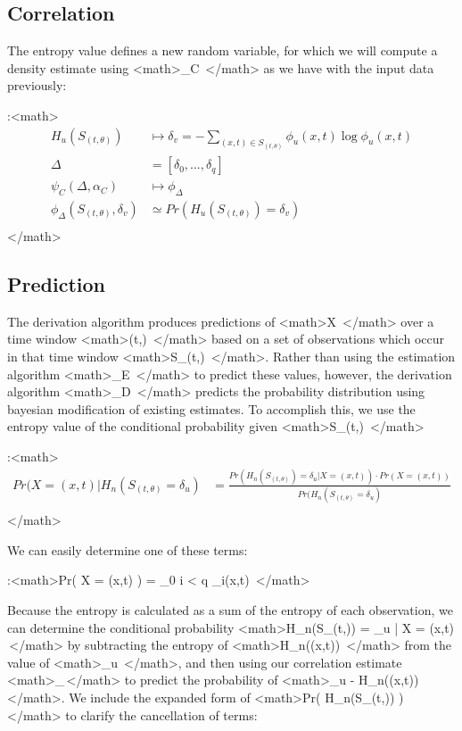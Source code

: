 \documentclass[11pt,twocolumn,titlepage]{article}
\begin{document}
\subsection{Correlation}
The entropy value defines a new random variable, for which we will compute a density estimate using <math>\psi_C \,\!</math> as we have with the input data previously:

:<math>
\begin{align}
H_u( S_{(t,\theta)} ) &\mapsto \delta_v = -\sum_{(x,t) \in S_{(t,\theta)}} \phi_u(x,t) \log \phi_u(x,t) \\
\Delta &= [\delta_0,...,\delta_q] \\
\psi_C( \Delta , \alpha_C ) &\mapsto \phi_\Delta\\
\phi_\Delta(S_{(t,\theta)},\delta_v) &\simeq Pr( H_u(S_{(t,\theta)}) = \delta_v ) \\
\end{align}
</math>

\subsection{Prediction}
The derivation algorithm produces predictions of <math>X \,\!</math> over a time window <math>(t,\theta) \,\!</math> based on a set of observations which occur in that time window <math>S_{(t,\theta)} \,\!</math>.  Rather than using the estimation algorithm <math>\psi_E \,\!</math> to predict these values, however, the derivation algorithm <math>\psi_D \,\!</math> predicts the probability distribution  using bayesian modification of existing estimates.  To accomplish this, we use the entropy value of the conditional probability given <math>S_{(t,\theta)} \,\!</math>

:<math>
\begin{align}
Pr( X = (x,t) | H_n(S_{(t,\theta)} = \delta_u ) &= \frac 
{ Pr( H_n( S_{(t,\theta)} ) = \delta_u | X = (x,t) ) \cdot Pr( X = (x,t) ) }
{ Pr( H_n( S_{(t,\theta)} = \delta_u ) } \\
\end{align}
</math>


We can easily determine one of these terms:

:<math>Pr( X = (x,t) ) = \prod_{0 \le i < q} \phi_i(x,t) \,\!</math>


Because the entropy is calculated as a sum of the entropy of each observation, we can determine the conditional probability <math>H_n(S_{(t,\theta)}) = \delta_u | X = (x,t) \,\!</math> by subtracting the entropy of <math>H_n((x,t)) \,\!</math> from the value of <math>\delta_u \,\!</math>, and then using our correlation estimate <math>\phi_\Delta \,\!</math> to predict the probability of <math>\delta_u - H_n((x,t)) \,\!</math>.  We include the expanded form of <math>Pr( H_n(S_{(t,\theta)}) ) \,\!</math> to clarify the cancellation of terms:
\end{document}
